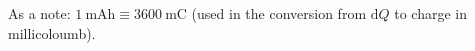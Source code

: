 As a note: $\SI{1}{\mA\hour} \equiv \SI{3600}{\milli\coulomb}$ (used in the conversion from $\text{d}Q$ to charge in millicoloumb).
